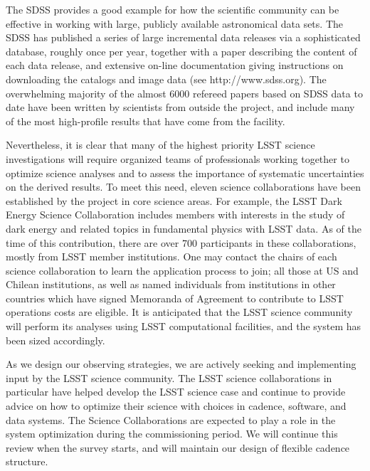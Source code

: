 \documentclass{emulateapj}
\begin{document}
The SDSS provides a good example for how the scientific 
community can be effective in working with large, publicly available
astronomical data sets. The SDSS has published a series of large incremental
data releases via a sophisticated database, roughly once per year, together with 
a paper describing the content of each data release, and extensive on-line 
documentation giving instructions on downloading the catalogs and image data
(see http://www.sdss.org). The overwhelming majority of the almost
6000 refereed papers based 
on SDSS data to date have been written by scientists from outside 
the project, and  include many of the most high-profile results that have come 
from the facility. 

Nevertheless, it is clear that many of the highest priority LSST science
investigations will require organized teams of professionals working together
to optimize science analyses and to assess the importance of systematic 
uncertainties on the derived results. To meet this need, eleven science
collaborations have been established by the project in core science
areas. For example, the LSST Dark Energy Science Collaboration includes
members with interests in the study of dark energy and related topics in 
fundamental physics with LSST data. As of the time of this contribution, there are 
over 700 participants in these collaborations, mostly from LSST member institutions. 
One may contact the chairs of each science collaboration to learn the
application process to join; all those at US and Chilean institutions,
as well as named individuals from institutions in other countries
which have signed Memoranda of Agreement to contribute to LSST
operations costs are eligible.  
It is anticipated that the LSST science community  will perform its
analyses using  
LSST computational facilities, and the system has been sized accordingly. 

As we design our observing strategies, we are actively seeking and implementing
input by the LSST science community.  The LSST science collaborations
in particular have helped develop the LSST science case and continue
to provide advice on how to optimize their science with choices in
cadence, software,  
and data systems. The Science Collaborations are expected to play a
role  
in the system optimization during the commissioning period. We will continue 
this review when the survey starts, and will maintain our design of flexible 
cadence structure.
\end{document}
